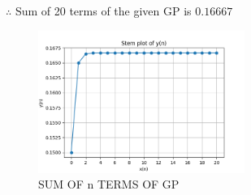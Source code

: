 \documentclass[journal,12pt,twocolumn]{IEEEtran}
\theoremstyle{remark}
\begin{document}
        $\therefore$ Sum of 20 terms of the given GP is $0.16667$
       \renewcommand{\thefigure}{\theenumi}
 \renewcommand{\thetable}{\theenumi}
\begin{figure}[h]
  \centering
  \includegraphics[width=0.6\textwidth]{figs/graph.png}
  \caption{SUM OF n TERMS OF GP}
  \label{fig:your_label}
\end{figure}
\end{document}
